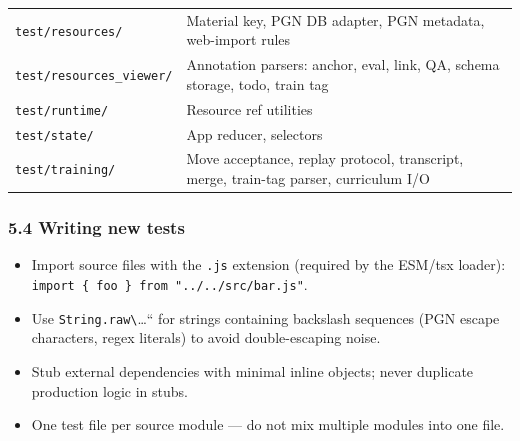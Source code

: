 \documentclass[]{article}
\providecommand{\tightlist}{%
  \setlength{\itemsep}{0pt}\setlength{\parskip}{0pt}}
\begin{document}
\begin{longtable}[]{@{}ll@{}}
\begin{minipage}[t]{0.05\columnwidth}
\texttt{test/resources/}\strut
\end{minipage} & \begin{minipage}[t]{0.05\columnwidth}\raggedright\strut
Material key, PGN DB adapter, PGN metadata, web-import rules\strut
\end{minipage}\tabularnewline
\begin{minipage}[t]{0.05\columnwidth}\raggedright\strut
\texttt{test/resources\_viewer/}\strut
\end{minipage} & \begin{minipage}[t]{0.05\columnwidth}\raggedright\strut
Annotation parsers: anchor, eval, link, QA, schema storage, todo, train
tag\strut
\end{minipage}\tabularnewline
\begin{minipage}[t]{0.05\columnwidth}\raggedright\strut
\texttt{test/runtime/}\strut
\end{minipage} & \begin{minipage}[t]{0.05\columnwidth}\raggedright\strut
Resource ref utilities\strut
\end{minipage}\tabularnewline
\begin{minipage}[t]{0.05\columnwidth}\raggedright\strut
\texttt{test/state/}\strut
\end{minipage} & \begin{minipage}[t]{0.05\columnwidth}\raggedright\strut
App reducer, selectors\strut
\end{minipage}\tabularnewline
\begin{minipage}[t]{0.05\columnwidth}\raggedright\strut
\texttt{test/training/}\strut
\end{minipage} & \begin{minipage}[t]{0.05\columnwidth}\raggedright\strut
Move acceptance, replay protocol, transcript, merge, train-tag parser,
curriculum I/O\strut
\end{minipage}\tabularnewline
\bottomrule
\end{longtable}

\subsubsection{5.4 Writing new tests}\label{writing-new-tests}

\begin{itemize}
\tightlist
\item
  Import source files with the \texttt{.js} extension (required by the
  ESM/tsx loader):
  \texttt{import\ \{\ foo\ \}\ from\ "../../src/bar.js"}.
\item
  Use \texttt{String.raw\textbackslash{}}\ldots{}`` for strings
  containing backslash sequences (PGN escape characters, regex literals)
  to avoid double-escaping noise.
\item
  Stub external dependencies with minimal inline objects; never
  duplicate production logic in stubs.
\item
  One test file per source module --- do not mix multiple modules into
  one file.
\end{itemize}
\end{document}
